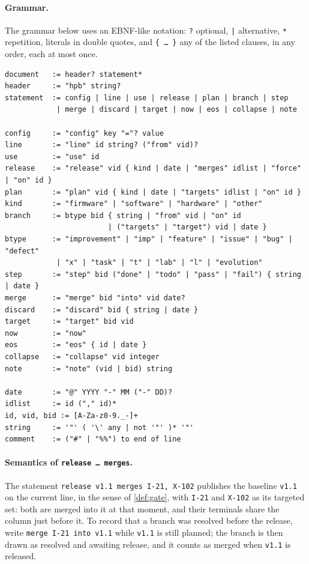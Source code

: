 \paragraph{Grammar.}
The grammar below uses an EBNF-like notation: \texttt{?} optional,
\texttt{|} alternative, \texttt{*} repetition, literals in double quotes,
and \texttt{\{ \dots{} \}} any of the listed clauses, in any order, each at
most once.

\begin{lstlisting}[language=hpbplain,basicstyle=\ttfamily\scriptsize]
document   := header? statement*
header     := "hpb" string?
statement  := config | line | use | release | plan | branch | step
            | merge | discard | target | now | eos | collapse | note

config     := "config" key "="? value
line       := "line" id string? ("from" vid)?
use        := "use" id
release    := "release" vid { kind | date | "merges" idlist | "force" | "on" id }
plan       := "plan" vid { kind | date | "targets" idlist | "on" id }
kind       := "firmware" | "software" | "hardware" | "other"
branch     := btype bid { string | "from" vid | "on" id
                        | ("targets" | "target") vid | date }
btype      := "improvement" | "imp" | "feature" | "issue" | "bug" | "defect"
            | "x" | "task" | "t" | "lab" | "l" | "evolution"
step       := "step" bid ("done" | "todo" | "pass" | "fail") { string | date }
merge      := "merge" bid "into" vid date?
discard    := "discard" bid { string | date }
target     := "target" bid vid
now        := "now"
eos        := "eos" { id | date }
collapse   := "collapse" vid integer
note       := "note" (vid | bid) string

date       := "@" YYYY "-" MM ("-" DD)?
idlist     := id ("," id)*
id, vid, bid := [A-Za-z0-9._-]+
string     := '"' ( '\' any | not '"' )* '"'
comment    := ("#" | "%%") to end of line
\end{lstlisting}

\paragraph{Semantics of \texttt{release \dots{} merges}.}
The statement \lstinline[style=hpb]|release v1.1 merges I-21, X-102|
publishes the baseline \texttt{v1.1} on the current line, in the sense of
\cref{def:gate}, with
\texttt{I-21} and \texttt{X-102} as its targeted set: both are merged into
it at that moment, and their terminals share the column just before it.
To record that a branch was resolved before the release, write
\texttt{merge I-21 into v1.1} while \texttt{v1.1} is still planned; the
branch is then drawn as resolved and awaiting release, and it counts as
merged when \texttt{v1.1} is released.

